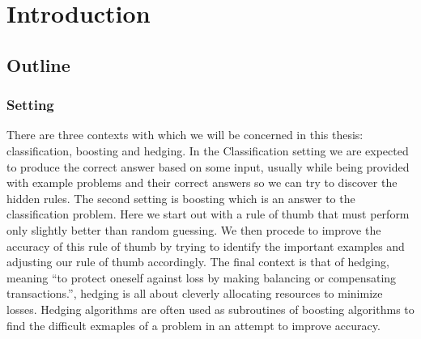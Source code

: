 
\chapter{Introduction}
\label{chap:intro}


\section{Outline}
\subsection{Setting}
There are three contexts with which we will be concerned in this thesis: classification, boosting and hedging.
In the Classification setting we are expected to produce the correct answer based on some input, usually while being provided with example problems and their correct answers so we can try to discover the hidden rules. The second setting is boosting which is an answer to the classification problem. Here we start out with a rule of thumb that must perform only slightly better than random guessing. We then procede to improve the accuracy of this rule of thumb by trying to identify the important examples and adjusting our rule of thumb accordingly. The final context is that of hedging, meaning ``to protect oneself against loss by making balancing or compensating transactions.'', hedging is all about cleverly allocating resources to minimize losses. Hedging algorithms are often used as subroutines of boosting algorithms to find the difficult exmaples of a problem in an attempt to improve accuracy.

